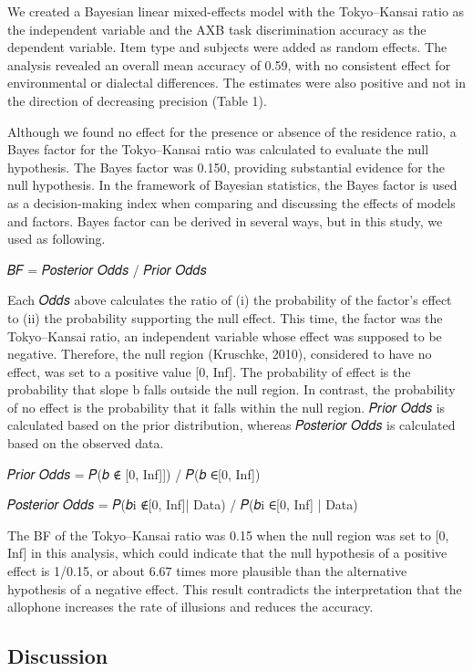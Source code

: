 \documentclass[a4paper,11pt,twocolumn]{article}
\begin{document}
We created a Bayesian linear mixed-effects model \cite{lmer, rstanarm, easy} with the Tokyo--Kansai ratio as the independent variable and the AXB task discrimination accuracy as the dependent variable. Item type and subjects were added as random effects. The analysis revealed an overall mean accuracy of 0.59, with no consistent effect for environmental or dialectal differences. The estimates were also positive and not in the direction of decreasing precision (Table 1).


Although we found no effect for the presence or absence of the residence ratio, a Bayes factor for the Tokyo--Kansai ratio was calculated to evaluate the null hypothesis. The Bayes factor was 0.150, providing substantial evidence for the null hypothesis. In the framework of Bayesian statistics, the Bayes factor is used as a decision-making index when comparing and discussing the effects of models and factors. Bayes factor can be derived in several ways, but in this study, we used as following.

𝐵𝐹 = 𝑃𝑜𝑠𝑡𝑒𝑟𝑖𝑜𝑟 𝑂𝑑𝑑𝑠 / 𝑃𝑟𝑖𝑜𝑟 𝑂𝑑𝑑𝑠

Each 𝑂𝑑𝑑𝑠 above calculates the ratio of (i) the probability of the factor’s effect to (ii) the probability supporting the null effect. This time, the factor was the Tokyo--Kansai ratio, an independent variable whose effect was supposed to be negative. Therefore, the null region (Kruschke, 2010), considered to have no effect, was set to a positive value [0, Inf]. The probability of effect is the probability that slope b falls outside the null region. In contrast, the probability of no effect is the probability that it falls within the null region. 𝑃𝑟𝑖𝑜𝑟 𝑂𝑑𝑑𝑠 is calculated based on the prior distribution, whereas 𝑃𝑜𝑠𝑡𝑒𝑟𝑖𝑜𝑟 𝑂𝑑𝑑𝑠 is calculated based on the observed data.

𝑃𝑟𝑖𝑜𝑟 𝑂𝑑𝑑𝑠  = 𝑃(𝑏 ∉ [0, Inf]]) / 𝑃(𝑏  ∈[0, Inf])

𝑃𝑜𝑠𝑡𝑒𝑟𝑖𝑜𝑟 𝑂𝑑𝑑𝑠 = 𝑃(𝑏i ∉[0, Inf]| Data) / 𝑃(𝑏i ∈[0, Inf] | Data)

The BF of the Tokyo--Kansai ratio was 0.15 when the null region was set to [0, Inf] in this analysis, which could indicate that the null hypothesis of a positive effect is 1/0.15, or about 6.67 times more plausible than the alternative hypothesis of a negative effect. This result contradicts the interpretation that the allophone increases the rate of illusions and reduces the accuracy.

\subsection{Discussion}
\end{document}
